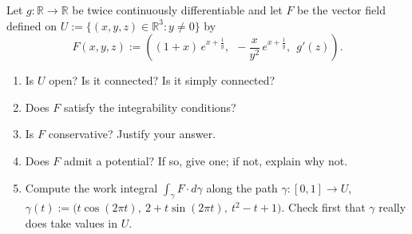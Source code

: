 \begin{exercise}
\label{ex:jossen_potential_on_disconnected_domain}
Let $g : \mathbb{R} \to \mathbb{R}$ be twice continuously differentiable and let $F$ be the vector
field defined on $U := \{(x,y,z) \in \mathbb{R}^3 : y \neq 0\}$ by
\[F(x,y,z) := \left((1+x)\,e^{x+\frac1y},\ \ -\frac{x}{y^2}\,e^{x+\frac1y},\ \ g'(z)\right).\]
\begin{enumerate}[label=\textbf{(\alph*)}]
  \item Is $U$ open? Is it connected? Is it simply connected?
  \item Does $F$ satisfy the integrability conditions?
  \item Is $F$ conservative? Justify your answer.
  \item Does $F$ admit a potential? If so, give one; if not, explain why not.
  \item Compute the work integral $\int_\gamma F \cdot d\gamma$ along the path
    $\gamma : [0,1] \to U$, $\gamma(t) := \big(t\cos(2\pi t),\ 2 + t\sin(2\pi t),\ t^2-t+1\big)$.
    Check first that $\gamma$ really does take values in $U$.
\end{enumerate}
\end{exercise}

